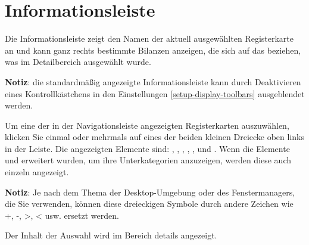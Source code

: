 \section{Informationsleiste\label{home-synthesis}}

Die Informationsleiste zeigt den Namen der aktuell ausgewählten Registerkarte an und kann ganz rechts bestimmte Bilanzen anzeigen, die sich auf das beziehen, was im Detailbereich ausgewählt wurde.%


\textbf{Notiz}: die standardmäßig angezeigte Informationsleiste kann durch Deaktivieren eines Kontrollkästchens in den Einstellungen \vref{setup-display-toolbars} ausgeblendet werden.%

Um eine der in der Navigationsleiste angezeigten Registerkarten auszuwählen, klicken Sie einmal oder mehrmals auf eines der beiden kleinen Dreiecke oben links in der Leiste.  Die angezeigten Elemente sind: , , , , ,  und .  Wenn die Elemente  und  erweitert wurden, um ihre Unterkategorien anzuzeigen, werden diese auch einzeln angezeigt.%


\textbf{Notiz}: Je nach dem Thema der Desktop-Umgebung oder des Fenstermanagers, die Sie verwenden, können diese dreieckigen Symbole durch andere Zeichen wie +, -, >, < usw. ersetzt werden.%

Der Inhalt der Auswahl wird im Bereich details angezeigt.%

